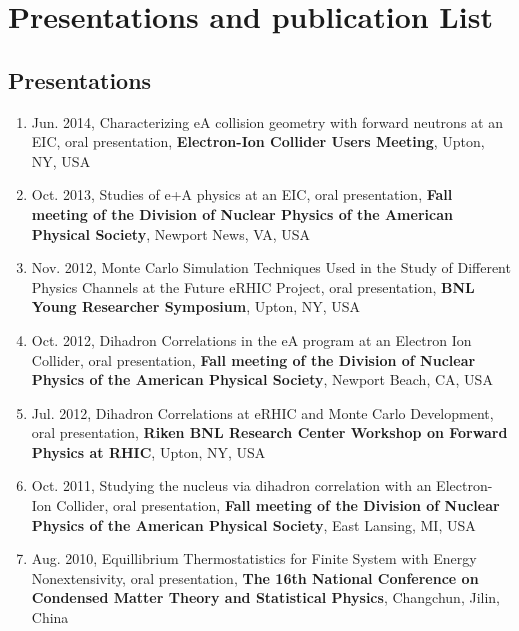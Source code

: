\chapter*{Presentations and publication List}

\section*{Presentations}

\begin{enumerate}
  
\item Jun. 2014, Characterizing eA collision geometry with forward neutrons at an EIC, oral presentation,
  \textbf{Electron-Ion Collider Users Meeting}, Upton, NY, USA
  
\item Oct. 2013, Studies of e+A physics at an EIC, oral presentation,
  \textbf{Fall meeting of the Division of Nuclear Physics of the American Physical Society}, Newport News, VA, USA
  
\item Nov. 2012, Monte Carlo Simulation Techniques Used in the Study of Different Physics Channels at the Future eRHIC Project, oral presentation,
  \textbf{BNL Young Researcher Symposium}, Upton, NY, USA  
  
\item Oct. 2012, Dihadron Correlations in the eA program at an Electron Ion Collider, oral presentation,
  \textbf{Fall meeting of the Division of Nuclear Physics of the American Physical Society}, Newport Beach, CA, USA

\item Jul. 2012, Dihadron Correlations at eRHIC and Monte Carlo Development, oral presentation,
  \textbf{Riken BNL Research Center Workshop on Forward Physics at RHIC}, Upton, NY, USA

\item Oct. 2011, Studying the nucleus via dihadron correlation with an Electron-Ion Collider, oral presentation,
  \textbf{Fall meeting of the Division of Nuclear Physics of the American Physical Society}, East Lansing, MI, USA

\item Aug. 2010, Equillibrium Thermostatistics for Finite System with Energy Nonextensivity, oral presentation,
  \textbf{The 16th National Conference on Condensed Matter Theory and Statistical Physics}, Changchun, Jilin, China
\end{enumerate}

